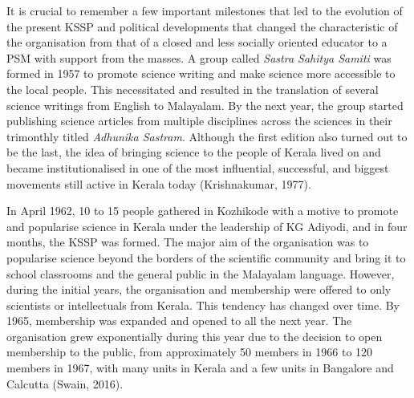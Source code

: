 \documentclass[twoside, 13pt]{article}
\begin{document}
{{\fontsize{12}{14}\selectfont It is crucial to remember a few important milestones that led to the evolution of the present KSSP and political developments that changed the characteristic of the organisation from that of a closed and less socially oriented educator to a PSM with support from the masses. A group called \textit{Sastra Sahitya Samiti} was formed in 1957 to promote science writing and make science more accessible to the local people. This necessitated and resulted in the translation of several science writings from English to Malayalam. By the next year, the group started publishing science articles from multiple disciplines across the sciences in their trimonthly titled \textit{Adhunika Sastram}. Although the first edition also turned out to be the last, the idea of bringing science to the people of Kerala lived on and became institutionalised in one of the most influential, successful, and biggest movements still active in Kerala today (Krishnakumar, 1977). 

In April 1962, 10 to 15 people gathered in Kozhikode with a motive to promote and popularise science in Kerala under the leadership of KG Adiyodi, and in four months, the KSSP was formed. The major aim of the organisation was to popularise science beyond the borders of the scientific community and bring it to school classrooms and the general public in the Malayalam language. However, during the initial years, the organisation and membership were offered to only scientists or intellectuals from Kerala. This tendency has changed over time. By 1965, membership was expanded and opened to all the next year. The organisation grew exponentially during this year due to the decision to open membership to the public, from approximately 50 members in 1966 to 120 members in 1967, with many units in Kerala and a few units in Bangalore and Calcutta (Swain, 2016). 

}}
\end{document}
